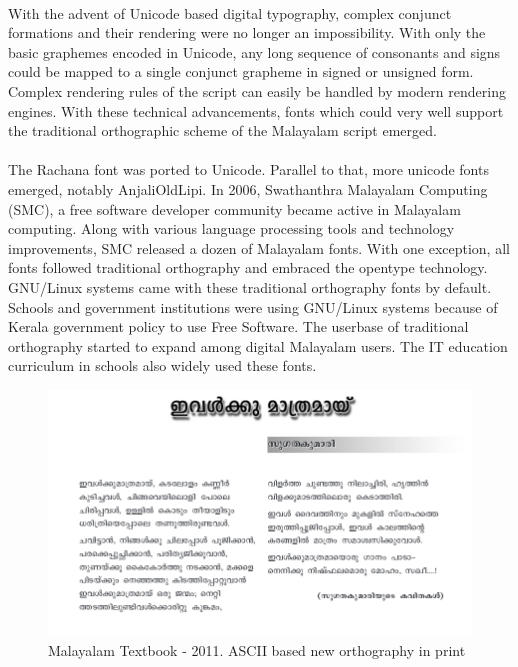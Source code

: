 \documentclass[10pt]{article}
\begin{document}
\paragraph{}
With the advent of Unicode based digital typography, complex conjunct formations and their rendering were no longer an impossibility. With only the basic graphemes encoded in Unicode, any long sequence of consonants and signs could be mapped to a single conjunct grapheme in signed or unsigned form. Complex rendering rules of the script can easily be handled by modern rendering engines. With these technical advancements, fonts which could very well support the traditional orthographic scheme of the Malayalam script emerged. 

\paragraph{}
The Rachana font was ported to Unicode. Parallel to that, more unicode fonts emerged, notably AnjaliOldLipi. In 2006, Swathanthra Malayalam Computing (SMC), a free software developer community became active in Malayalam computing. Along with various language processing tools and technology improvements, SMC released a dozen of Malayalam fonts. With one exception, all fonts followed traditional orthography and embraced the opentype technology. GNU/Linux systems came with these traditional orthography fonts by default. Schools and government institutions were using GNU/Linux systems because of Kerala government policy to use Free Software. The userbase of traditional orthography started to expand among digital Malayalam users. The IT education curriculum in schools also widely used these fonts.

\begin{figure}[H]
	\centering
	\includegraphics[scale=0.5]{images/2011-Malayalam-Textbook.png}
	\caption{Malayalam Textbook - 2011. ASCII based new orthography in print}
	\label{textbook2011}
\end{figure}
\end{document}
